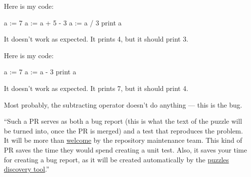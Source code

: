 \documentclass{article}
\begin{document}
\begin{pptWide}{2}
{\small\begin{ffcode}
Here is my code:

a := 7
a := a + 5 - 3
a := a / 3
print a

It doesn't work as expected.
It prints 4, but it should
print 3.
\end{ffcode}
}
\par\columnbreak\par
{\small\begin{ffcode}
Here is my code:

a := 7
a := a - 3
print a

It doesn't work as expected.
It prints 7, but it should
print 4.
\end{ffcode}
}
Most probably, the subtracting operator doesn't do anything --- this is the bug.
\end{pptWide}
\plush{}




\begin{pptWide}{2}
{\small{}
}
\par\columnbreak\par
``Such a PR serves as both a bug report (this is what the text of the puzzle will be turned into, once the PR is merged) and a test that reproduces the problem. It will be more than \ul{welcome} by the repository maintenance team. This kind of PR saves the time they would spend creating a unit test. Also, it saves your time for creating a bug report, as it will be created automatically by the \ul{puzzles discovery tool}.''~\citep{bugayenko2023blog0725}
\end{pptWide}
\plush{}
\end{document}
